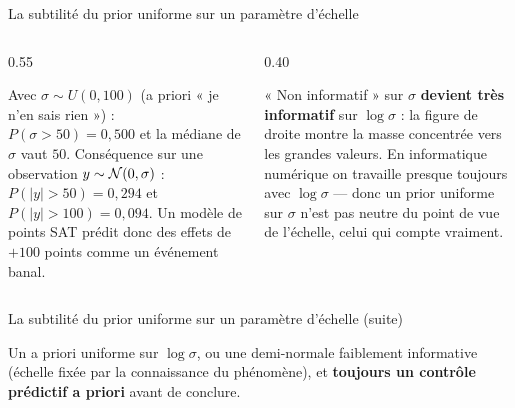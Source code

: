\begin{frame}{La subtilité du prior uniforme sur un paramètre d'échelle}
\vspace{-1mm}
\begin{columns}[t]
\begin{column}{0.55\textwidth}
\begin{ebox}
Avec $\sigma \sim U(0, 100)$ (a priori « je n'en sais rien ») :
$P(\sigma > 50) = 0{,}500$ et la médiane de $\sigma$ vaut $50$.
Conséquence sur une observation $y \sim \mathcal{N}(0,\sigma)$ :
$P(|y| > 50) = 0{,}294$ et $P(|y| > 100) = 0{,}094$.
Un modèle de points SAT prédit donc des effets de $+100$ points comme
un événement banal.
\end{ebox}
\end{column}
\begin{column}{0.40\textwidth}
\begin{wbox}
« Non informatif » sur $\sigma$ \textbf{devient très informatif} sur
$\log\sigma$ : la figure de droite montre la masse concentrée vers les grandes
valeurs. En informatique numérique on travaille presque toujours avec
$\log\sigma$ — donc un prior uniforme sur $\sigma$ n'est pas neutre du point
de vue de l'échelle, celui qui compte vraiment.
\end{wbox}
\end{column}
\end{columns}
\end{frame}

\begin{frame}{La subtilité du prior uniforme sur un paramètre d'échelle (suite)}
\begin{kbox}
Un a priori uniforme sur $\log\sigma$, ou une demi-normale faiblement
informative (échelle fixée par la connaissance du phénomène), et
\textbf{toujours un contrôle prédictif a priori} avant de conclure.
\end{kbox}

\end{frame}


